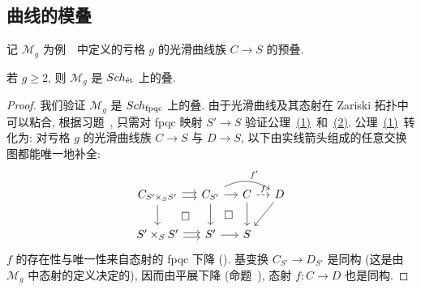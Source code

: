 \subsection{曲线的模叠}\label{src:3.5.4-subsection}
记 $\mathcal M_g$ 为例~~中定义的亏格 $g$ 的光滑曲线族 $C\to S$ 的预叠.
\begin{proposition}[光滑曲线的模叠]\label{src:3.5.14}
若 $g\geq2$, 则 $\mathcal M_g$ 是 $Sch_{\text{ét}}$ 上的叠.
\end{proposition}
\begin{proof}
我们验证 $\mathcal M_g$ 是 $Sch_{\mathrm{fpqc}}$ 上的叠. 由于光滑曲线及其态射在 Zariski 拓扑中可以粘合, 根据习题~, 只需对 fpqc 映射 $S'\to S$ 验证公理~\hyperlink{stack-axiom-1}{(1)}~和~\hyperlink{stack-axiom-2}{(2)}.
公理~\hyperlink{stack-axiom-1}{(1)}~转化为: 对亏格 $g$ 的光滑曲线族 $C\to S$ 与 $D\to S$, 以下由实线箭头组成的任意交换图都能唯一地补全:
\[
\begin{tikzcd}[column sep=small]
C_{S'\times_S S'}\arrow[r,shift left=2pt]\arrow[r,shift right=2pt]\arrow[d]\arrow[dr,phantom,"\square"]&
C_{S'}\arrow[r]\arrow[rr,bend left=30,"f'"]\arrow[d]\arrow[dr,phantom,"\square"]&
C\arrow[r,dashed,"f"]\arrow[d]&D\arrow[dl]\\
S'\times_S S'\arrow[r,shift left=2pt]\arrow[r,shift right=2pt]&S'\arrow[r]&S&
\end{tikzcd}
\]
$f$ 的存在性与唯一性来自态射的 fpqc 下降 (). 基变换 $C_{S'}\to D_{S'}$ 是同构 (这是由 $\mathcal M_g$ 中态射的定义决定的), 因而由平展下降 (命题~), 态射 $f:C\to D$ 也是同构.


\end{proof}
